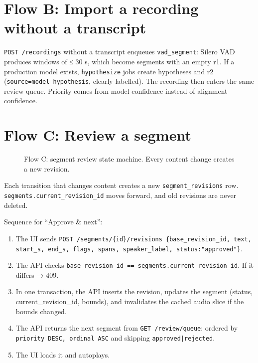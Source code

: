 \documentclass[11pt]{article}
\begin{document}
\hypertarget{flow-b-import-a-recording-without-a-transcript}{%
\section{Flow B: Import a recording without a transcript}\label{flow-b-import-a-recording-without-a-transcript}}

\texttt{POST /\allowbreak{}recordings} without a transcript enqueues \texttt{vad\_\allowbreak{}segment}: Silero VAD produces windows of ≤ 30 s, which become segments with an empty r1. If a production model exists, \texttt{hypothesize} jobs create hypotheses and r2 (\texttt{source=\allowbreak{}model\_\allowbreak{}hypothesis}, clearly labelled). The recording then enters the same review queue. Priority comes from model confidence instead of alignment confidence.

\hypertarget{flow-c-review-a-segment}{%
\section{Flow C: Review a segment}\label{flow-c-review-a-segment}}

\begin{figure}[!htbp]\centering
\resizebox{\ifdim\width>\linewidth\linewidth\else\width\fi}{!}{}
\caption{Flow C: segment review state machine. Every content change creates a new revision.}
\end{figure}

Each transition that changes content creates a new \texttt{segment\_\allowbreak{}revisions} row. \texttt{segments.\allowbreak{}current\_\allowbreak{}revision\_\allowbreak{}id} moves forward, and old revisions are never deleted.

Sequence for ``Approve \& next'':

\begin{enumerate}
\def\labelenumi{\arabic{enumi}.}
\tightlist
\item
  The UI sends \texttt{POST /\allowbreak{}segments/\allowbreak{}\{id\}/\allowbreak{}revisions \{base\_\allowbreak{}revision\_\allowbreak{}id,\allowbreak{} text,\allowbreak{} start\_\allowbreak{}s,\allowbreak{} end\_\allowbreak{}s,\allowbreak{} flags,\allowbreak{} spans,\allowbreak{} speaker\_\allowbreak{}label,\allowbreak{} status:\allowbreak{}"approved"\}}.
\item
  The API checks \texttt{base\_\allowbreak{}revision\_\allowbreak{}id =\allowbreak{}=\allowbreak{} segments.\allowbreak{}current\_\allowbreak{}revision\_\allowbreak{}id}. If it differs → 409.
\item
  In one transaction, the API inserts the revision, updates the segment (status, current\_revision\_id, bounds), and invalidates the cached audio slice if the bounds changed.
\item
  The API returns the next segment from \texttt{GET /\allowbreak{}review/\allowbreak{}queue}: ordered by \texttt{priority DESC,\allowbreak{} ordinal ASC} and skipping \texttt{approved|\allowbreak{}rejected}.
\item
  The UI loads it and autoplays.
\end{enumerate}
\end{document}
